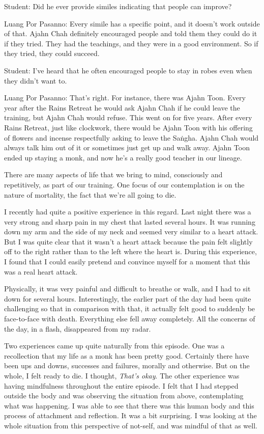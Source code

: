 Student: Did he ever provide similes indicating that people can improve?

Luang Por Pasanno: Every simile has a specific point, and it doesn't 
work outside of that. Ajahn Chah definitely encouraged people and told 
them they could do it if they tried. They had the teachings, and they 
were in a good environment. So if they tried, they could succeed.

Student: I've heard that he often encouraged people to stay in robes 
even when they didn't want to.

Luang Por Pasanno: That's right. For instance, there was Ajahn Toon. 
Every year after the Rains Retreat he would ask Ajahn Chah if he could 
leave the training, but Ajahn Chah would refuse. This went on for five 
years. After every Rains Retreat, just like clockwork, there would be 
Ajahn Toon with his offering of flowers and incense respectfully asking 
to leave the Saṅgha. Ajahn Chah would always talk him out of it or 
sometimes just get up and walk away. Ajahn Toon ended up staying a 
monk, and now he's a really good teacher in our lineage.


There are many aspects of life that we bring to mind, consciously and 
repetitively, as part of our training. One focus of our contemplation 
is on the nature of mortality, the fact that we're all going to die.

I recently had quite a positive experience in this regard. Last night 
there was a very strong and sharp pain in my chest that lasted several 
hours. It was running down my arm and the side of my neck and seemed 
very similar to a heart attack. But I was quite clear that it wasn't a 
heart attack because the pain felt slightly off to the right rather 
than to the left where the heart is. During this experience, I found 
that I could easily pretend and convince myself for a moment that this 
was a real heart attack.

Physically, it was very painful and difficult to breathe or walk, and I 
had to sit down for several hours. Interestingly, the earlier part of 
the day had been quite challenging so that in comparison with that, it 
actually felt good to suddenly be face-to-face with death. Everything 
else fell away completely. All the concerns of the day, in a flash, 
disappeared from my radar.

Two experiences came up quite naturally from this episode. One was a 
recollection that my life as a monk has been pretty good. Certainly 
there have been ups and downs, successes and failures, morally and 
otherwise. But on the whole, I felt ready to die. I thought, 
\emph{That's okay}. The other experience was having mindfulness 
throughout the entire episode. I felt that I had stepped outside the 
body and was observing the situation from above, contemplating what was 
happening. I was able to see that there was this human body and this 
process of attachment and reflection. It was a bit surprising. I was 
looking at the whole situation from this perspective of not-self, and 
was mindful of that as well.

